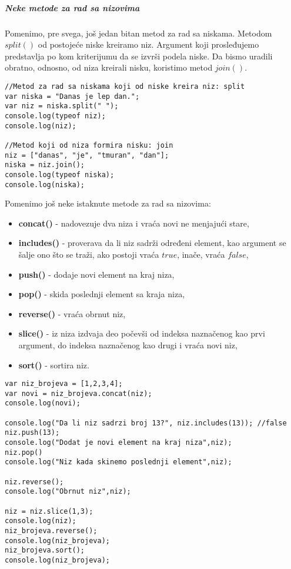 \subparagraph{Neke metode za rad sa nizovima}

Pomenimo, pre svega, još jedan bitan metod za rad sa niskama. Metodom $split()$ od postojeće niske kreiramo niz. Argument koji prosleđujemo predstavlja po kom kriterijumu da se izvrši podela niske. Da bismo uradili obratno, odnosno, od niza kreirali nisku, koristimo metod $join()$.
\begin{lstlisting}[backgroundcolor = \color{lightgray}, breaklines=true]
//Metod za rad sa niskama koji od niske kreira niz: split 
var niska = "Danas je lep dan.";
var niz = niska.split(" ");
console.log(typeof niz);
console.log(niz);

//Metod koji od niza formira nisku: join
niz = ["danas", "je", "tmuran", "dan"];
niska = niz.join();
console.log(typeof niska);
console.log(niska);
\end{lstlisting}
Pomenimo još neke istaknute metode za rad sa nizovima:  
\begin{itemize}
    \item \textbf{concat()} - nadovezuje dva niza i vraća novi ne menjajući stare,
    \item \textbf{includes()} - proverava da li niz sadrži određeni element, kao argument se šalje  ono što se traži, ako postoji vraća $true$, inače, vraća $false$,  
    \item \textbf{push()} - dodaje novi element na kraj niza, 
    \item \textbf{pop()} - skida poslednji element sa kraja niza, 
    \item \textbf{reverse()} - vraća obrnut niz, 
    \item \textbf{slice()} - iz niza izdvaja deo počevši od indeksa naznačenog kao prvi argument, do indeksa naznačenog kao drugi i vraća novi niz, 
    \item \textbf{sort()} - sortira niz.
\end{itemize}
\begin{lstlisting}[backgroundcolor = \color{lightgray}, breaklines=true]
var niz_brojeva = [1,2,3,4];
var novi = niz_brojeva.concat(niz);
console.log(novi);

console.log("Da li niz sadrzi broj 13?", niz.includes(13)); //false
niz.push(13);
console.log("Dodat je novi element na kraj niza",niz);
niz.pop()
console.log("Niz kada skinemo poslednji element",niz);
			
niz.reverse();
console.log("Obrnut niz",niz);

niz = niz.slice(1,3);
console.log(niz);
niz_brojeva.reverse();
console.log(niz_brojeva);
niz_brojeva.sort();
console.log(niz_brojeva);
\end{lstlisting}

